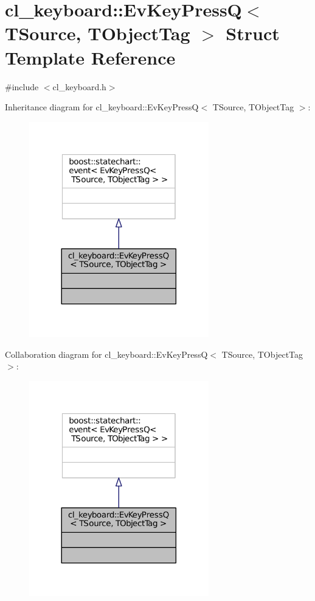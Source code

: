 \hypertarget{structcl__keyboard_1_1EvKeyPressQ}{}\section{cl\+\_\+keyboard\+:\+:Ev\+Key\+PressQ$<$ T\+Source, T\+Object\+Tag $>$ Struct Template Reference}
\label{structcl__keyboard_1_1EvKeyPressQ}


{\ttfamily \#include $<$cl\+\_\+keyboard.\+h$>$}



Inheritance diagram for cl\+\_\+keyboard\+:\+:Ev\+Key\+PressQ$<$ T\+Source, T\+Object\+Tag $>$\+:
\nopagebreak
\begin{figure}[H]
\begin{center}
\leavevmode
\includegraphics[width=221pt]{structcl__keyboard_1_1EvKeyPressQ__inherit__graph}
\end{center}
\end{figure}


Collaboration diagram for cl\+\_\+keyboard\+:\+:Ev\+Key\+PressQ$<$ T\+Source, T\+Object\+Tag $>$\+:
\nopagebreak
\begin{figure}[H]
\begin{center}
\leavevmode
\includegraphics[width=221pt]{structcl__keyboard_1_1EvKeyPressQ__coll__graph}
\end{center}
\end{figure}


